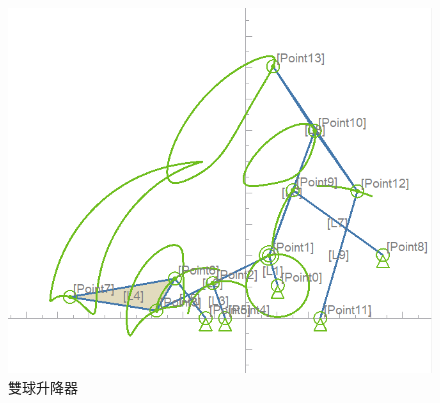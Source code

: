 \documentclass[14pt,a4paper]{report}  %
\begin{document}
{    \begin{figure}[H]
        \centering
        \includegraphics[scale=0.5]{雙球升降器.png} 
        \caption{雙球升降器} %
        \label{fig_Double Ball Lifter:scale} %
    \end{figure}
    
}
\end{document}
